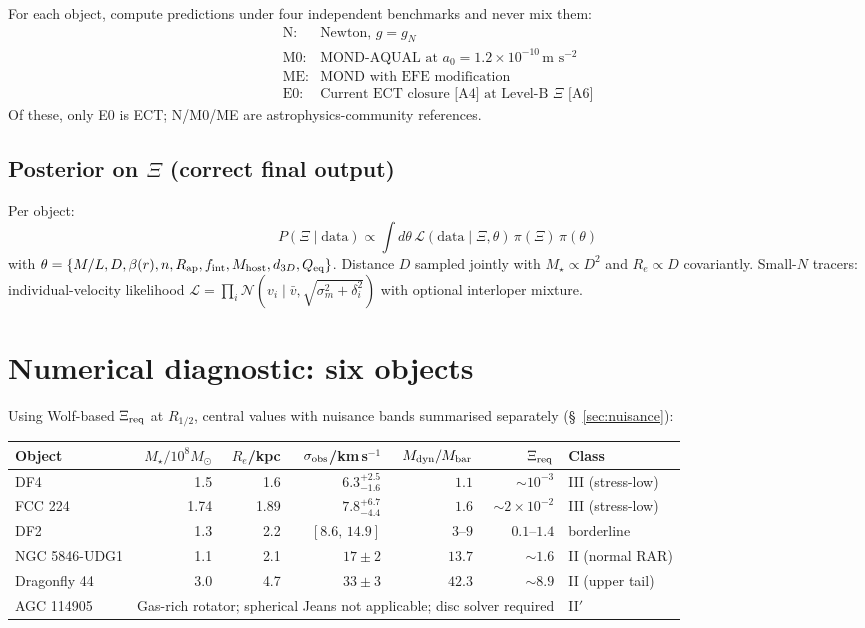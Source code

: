 \documentclass[11pt]{article}
\begin{document}
For each object, compute predictions under four independent benchmarks
and never mix them:
$$
\begin{array}{ll}
\text{N:}&\text{Newton, } g=g_N\\
\text{M0:}&\text{MOND-AQUAL at }a_0=1.2\times 10^{-10}\,\text{m s}^{-2}\\
\text{ME:}&\text{MOND with EFE modification}\\
\text{E0:}&\text{Current ECT closure [A4] at Level-B }\Xi\text{ [A6]}
\end{array}
$$
Of these, only E0 is ECT; N/M0/ME are astrophysics-community references.

\subsection{Posterior on $\Xi$ (correct final output)}

Per object:
$$
P(\Xi\mid\text{data}) \propto \int d\theta\,\mathcal{L}(\text{data}\mid\Xi,\theta)\,\pi(\Xi)\,\pi(\theta)
$$
with $\theta = \{M/L, D, \beta(r), n, R_{\rm ap}, f_{\rm int}, M_{\rm host}, d_{3D}, Q_{\rm eq}\}$.
Distance $D$ sampled jointly with $M_\star\propto D^2$ and $R_e\propto D$
covariantly. Small-$N$ tracers: individual-velocity likelihood
$\mathcal{L}=\prod_i\mathcal{N}(v_i\mid\bar v,\sqrt{\sigma_m^2+\delta_i^2})$
with optional interloper mixture.

\section{Numerical diagnostic: six objects}

Using Wolf-based $\Xi_{\rm req}$ at $R_{1/2}$, central values with
nuisance bands summarised separately (\S~\ref{sec:nuisance}):

\begin{longtable}{@{}l r r r r r l@{}}
\toprule
Object & $M_\star/10^8M_\odot$ & $R_e$/kpc & $\sigma_{\rm obs}$/km\,s$^{-1}$ &
$M_{\rm dyn}/M_{\rm bar}$ & $\Xi_{\rm req}$ & Class\\
\midrule
\endhead
\bottomrule
\endfoot
DF4           & 1.5  & 1.6  & $6.3^{+2.5}_{-1.6}$ & $1.1$   & $\sim 10^{-3}$      & III (stress-low) \\
FCC 224       & 1.74 & 1.89 & $7.8^{+6.7}_{-4.4}$ & $1.6$   & $\sim 2\times 10^{-2}$ & III (stress-low) \\
DF2           & 1.3  & 2.2  & $[8.6,\,14.9]$      & $3$--$9$ & $0.1$--$1.4$        & borderline \\
NGC 5846-UDG1 & 1.1  & 2.1  & $17\pm 2$           & $13.7$  & $\sim 1.6$          & II (normal RAR) \\
Dragonfly 44  & 3.0  & 4.7  & $33\pm 3$           & $42.3$  & $\sim 8.9$          & II (upper tail) \\
AGC 114905    & \multicolumn{5}{l}{Gas-rich rotator; spherical Jeans not applicable; disc solver required}& II$'$ \\
\end{longtable}
\end{document}

